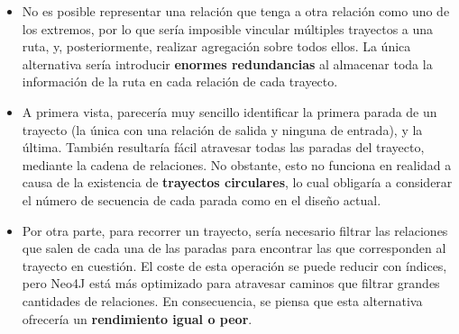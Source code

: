 \begin{itemize}
    \item No es posible representar una relación que tenga a otra relación como uno de los extremos, por lo que sería imposible vincular múltiples trayectos a una ruta, y, posteriormente, realizar agregación sobre todos ellos. La única alternativa sería introducir \textbf{enormes redundancias} al almacenar toda la información de la ruta en cada relación de cada trayecto.
    \item A primera vista, parecería muy sencillo identificar la primera parada de un trayecto (la única con una relación de salida y ninguna de entrada), y la última. También resultaría fácil atravesar todas las paradas del trayecto, mediante la cadena de relaciones. No obstante, esto no funciona en realidad a causa de la existencia de \textbf{trayectos circulares}, lo cual obligaría a considerar el número de secuencia de cada parada como en el diseño actual.
    \item Por otra parte, para recorrer un trayecto, sería necesario filtrar las relaciones que salen de cada una de las paradas para encontrar las que corresponden al trayecto en cuestión. El coste de esta operación se puede reducir con índices, pero Neo4J está más optimizado para atravesar caminos que filtrar grandes cantidades de relaciones. En consecuencia, se piensa que esta alternativa ofrecería un \textbf{rendimiento igual o peor}.
\end{itemize}

